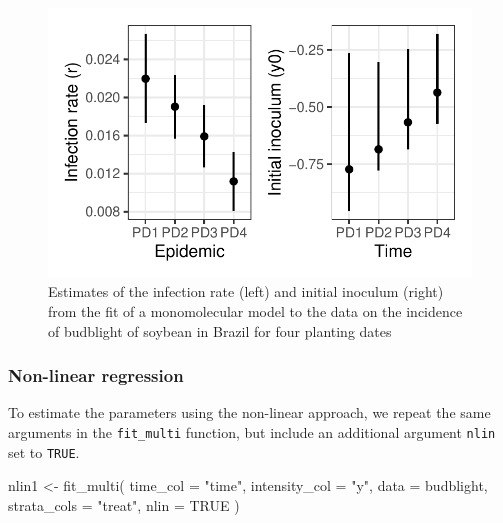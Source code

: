 \documentclass[
  letterpaper,
  DIV=11,
  numbers=noendperiod]{scrreprt}
\newenvironment{Shaded}{\begin{snugshade}}{\end{snugshade}}
\newcommand{\AttributeTok}[1]{\textcolor[rgb]{0.40,0.45,0.13}{#1}}
\newcommand{\ConstantTok}[1]{\textcolor[rgb]{0.56,0.35,0.01}{#1}}
\newcommand{\FunctionTok}[1]{\textcolor[rgb]{0.28,0.35,0.67}{#1}}
\newcommand{\NormalTok}[1]{\textcolor[rgb]{0.00,0.23,0.31}{#1}}
\newcommand{\OtherTok}[1]{\textcolor[rgb]{0.00,0.23,0.31}{#1}}
\newcommand{\StringTok}[1]{\textcolor[rgb]{0.13,0.47,0.30}{#1}}
\begin{document}
\begin{figure}[H]

{\centering \includegraphics{temporal-fitting_files/figure-pdf/fig-bud3-1.pdf}

}

\caption{\label{fig-bud3}Estimates of the infection rate (left) and
initial inoculum (right) from the fit of a monomolecular model to the
data on the incidence of budblight of soybean in Brazil for four
planting dates}

\end{figure}

\hypertarget{non-linear-regression}{%
\subsubsection{Non-linear regression}\label{non-linear-regression}}

To estimate the parameters using the non-linear approach, we repeat the
same arguments in the \texttt{fit\_multi} function, but include an
additional argument \texttt{nlin} set to \texttt{TRUE}.

\begin{Shaded}
\begin{Highlighting}[]
\NormalTok{nlin1 }\OtherTok{\textless{}{-}} \FunctionTok{fit\_multi}\NormalTok{(}
  \AttributeTok{time\_col =} \StringTok{"time"}\NormalTok{,}
  \AttributeTok{intensity\_col =} \StringTok{"y"}\NormalTok{,}
  \AttributeTok{data =}\NormalTok{ budblight,}
  \AttributeTok{strata\_cols =} \StringTok{"treat"}\NormalTok{,}
  \AttributeTok{nlin =} \ConstantTok{TRUE}
\NormalTok{)}
\end{Highlighting}
\end{Shaded}
\end{document}
